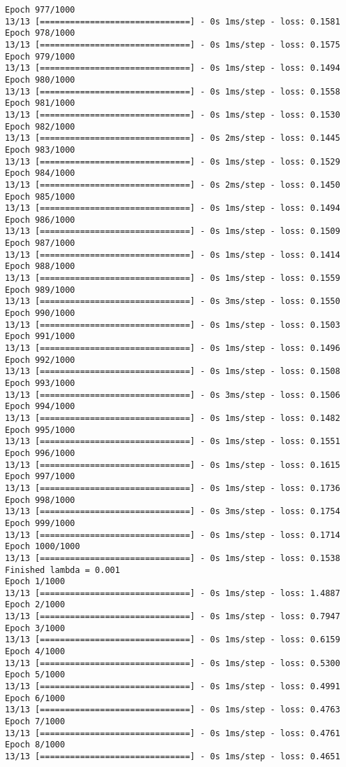 \documentclass[11pt]{article}
\begin{document}
\begin{Verbatim}[commandchars=\\\{\}]
Epoch 977/1000
13/13 [==============================] - 0s 1ms/step - loss: 0.1581
Epoch 978/1000
13/13 [==============================] - 0s 1ms/step - loss: 0.1575
Epoch 979/1000
13/13 [==============================] - 0s 1ms/step - loss: 0.1494
Epoch 980/1000
13/13 [==============================] - 0s 1ms/step - loss: 0.1558
Epoch 981/1000
13/13 [==============================] - 0s 1ms/step - loss: 0.1530
Epoch 982/1000
13/13 [==============================] - 0s 2ms/step - loss: 0.1445
Epoch 983/1000
13/13 [==============================] - 0s 1ms/step - loss: 0.1529
Epoch 984/1000
13/13 [==============================] - 0s 2ms/step - loss: 0.1450
Epoch 985/1000
13/13 [==============================] - 0s 1ms/step - loss: 0.1494
Epoch 986/1000
13/13 [==============================] - 0s 1ms/step - loss: 0.1509
Epoch 987/1000
13/13 [==============================] - 0s 1ms/step - loss: 0.1414
Epoch 988/1000
13/13 [==============================] - 0s 1ms/step - loss: 0.1559
Epoch 989/1000
13/13 [==============================] - 0s 3ms/step - loss: 0.1550
Epoch 990/1000
13/13 [==============================] - 0s 1ms/step - loss: 0.1503
Epoch 991/1000
13/13 [==============================] - 0s 1ms/step - loss: 0.1496
Epoch 992/1000
13/13 [==============================] - 0s 1ms/step - loss: 0.1508
Epoch 993/1000
13/13 [==============================] - 0s 3ms/step - loss: 0.1506
Epoch 994/1000
13/13 [==============================] - 0s 1ms/step - loss: 0.1482
Epoch 995/1000
13/13 [==============================] - 0s 1ms/step - loss: 0.1551
Epoch 996/1000
13/13 [==============================] - 0s 1ms/step - loss: 0.1615
Epoch 997/1000
13/13 [==============================] - 0s 1ms/step - loss: 0.1736
Epoch 998/1000
13/13 [==============================] - 0s 3ms/step - loss: 0.1754
Epoch 999/1000
13/13 [==============================] - 0s 1ms/step - loss: 0.1714
Epoch 1000/1000
13/13 [==============================] - 0s 1ms/step - loss: 0.1538
Finished lambda = 0.001
Epoch 1/1000
13/13 [==============================] - 0s 1ms/step - loss: 1.4887
Epoch 2/1000
13/13 [==============================] - 0s 1ms/step - loss: 0.7947
Epoch 3/1000
13/13 [==============================] - 0s 1ms/step - loss: 0.6159
Epoch 4/1000
13/13 [==============================] - 0s 1ms/step - loss: 0.5300
Epoch 5/1000
13/13 [==============================] - 0s 1ms/step - loss: 0.4991
Epoch 6/1000
13/13 [==============================] - 0s 1ms/step - loss: 0.4763
Epoch 7/1000
13/13 [==============================] - 0s 1ms/step - loss: 0.4761
Epoch 8/1000
13/13 [==============================] - 0s 1ms/step - loss: 0.4651

\end{Verbatim}
\end{document}
